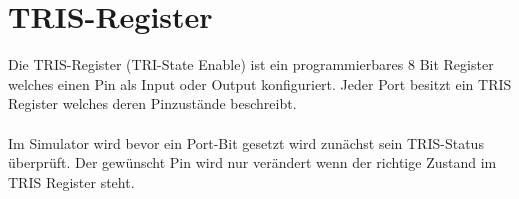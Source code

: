 \section{TRIS-Register}
Die TRIS-Register (TRI-State Enable) ist ein programmierbares 8 Bit Register welches einen Pin als Input oder Output konfiguriert. Jeder Port besitzt ein TRIS Register welches deren Pinzust\"ande beschreibt.
\\
\\Im Simulator wird bevor ein Port-Bit gesetzt wird zun\"achst sein TRIS-Status \"uberpr\"uft. Der gew\"unscht Pin wird nur ver\"andert wenn der richtige Zustand im TRIS Register steht.
\\

